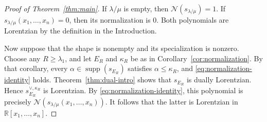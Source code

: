 \documentclass[10pt,a4paper]{amsart}
\newcommand{\Nop}{\mathcal N}
\newcommand{\R}{\mathbb R}
\newcommand{\supp}{\operatorname{supp}}
\begin{document}
\begin{proof}[Proof of Theorem~\ref{thm:main}]
If $\lambda/\mu$ is empty, then $\Nop(s_{\lambda/\mu})=1$.  If
$s_{\lambda/\mu}(x_1,\ldots,x_n)=0$, then its normalization is $0$.
Both polynomials are Lorentzian by the definition in the Introduction.

Now suppose that the shape is nonempty and its specialization is nonzero.
Choose any $R\ge\lambda_1$, and let $E_R$ and $\kappa_R$ be as in
Corollary~\ref{cor:normalization}.  By that corollary, every
$\alpha\in\supp(s_{E_R})$ satisfies $\alpha\le\kappa_R$, and
\eqref{eq:normalization-identity} holds.  Theorem~\ref{thm:dual-intro} shows
that $s_{E_R}$ is dually Lorentzian.  Hence
$s_{E_R}^{\vee,\kappa_R}$ is Lorentzian.  By
\eqref{eq:normalization-identity}, this polynomial is precisely
$\Nop(s_{\lambda/\mu}(x_1,\ldots,x_n))$.  It follows that the latter is
Lorentzian in
$\R[x_1,\ldots,x_n]$.
\end{proof}
\end{document}
